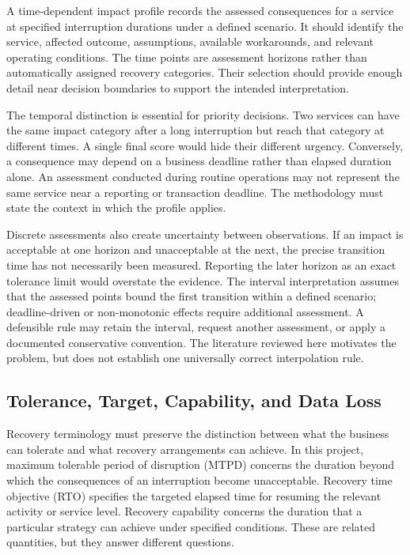 A time-dependent impact profile records the assessed consequences for a service at specified interruption durations under a defined scenario. It should identify the service, affected outcome, assumptions, available workarounds, and relevant operating conditions. The time points are assessment horizons rather than automatically assigned recovery categories. Their selection should provide enough detail near decision boundaries to support the intended interpretation.

The temporal distinction is essential for priority decisions. Two services can have the same impact category after a long interruption but reach that category at different times. A single final score would hide their different urgency. Conversely, a consequence may depend on a business deadline rather than elapsed duration alone. An assessment conducted during routine operations may not represent the same service near a reporting or transaction deadline. The methodology must state the context in which the profile applies.

Discrete assessments also create uncertainty between observations. If an impact is acceptable at one horizon and unacceptable at the next, the precise transition time has not necessarily been measured. Reporting the later horizon as an exact tolerance limit would overstate the evidence. The interval interpretation assumes that the assessed points bound the first transition within a defined scenario; deadline-driven or non-monotonic effects require additional assessment. A defensible rule may retain the interval, request another assessment, or apply a documented conservative convention. The literature reviewed here motivates the problem, but does not establish one universally correct interpolation rule.

\subsection{Tolerance, Target, Capability, and Data Loss}

Recovery terminology must preserve the distinction between what the business can tolerate and what recovery arrangements can achieve. In this project, maximum tolerable period of disruption (MTPD) concerns the duration beyond which the consequences of an interruption become unacceptable. Recovery time objective (RTO) specifies the targeted elapsed time for resuming the relevant activity or service level. Recovery capability concerns the duration that a particular strategy can achieve under specified conditions. These are related quantities, but they answer different questions.

